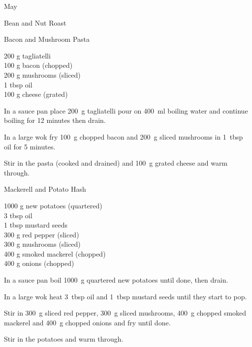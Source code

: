 \begin{menu}{May}
\begin{recipe}{2}{Bean and Nut Roast}
\begin{instructions}
    \end{instructions}
    \end{recipe}%
  
    \begin{recipe}{1}{Bacon and Mushroom Pasta}%
		\begin{ingredients}
		200 g tagliatelli  \\
	100 g bacon (chopped) \\
	200 g mushrooms (sliced) \\
	1 tbsp oil  \\
	100 g cheese (grated) \\
	
		\end{ingredients}
	
    \begin{instructions}
    \item 
      In a
      sauce pan
      place
      200~g  tagliatelli
      pour on
      400~ml  boiling water and continue boiling for 12 minutes then drain.
    \item 
        In a large wok fry 100~g chopped bacon
        and
        200~g sliced mushrooms
        in
        1~tbsp  oil for 5 minutes.
      \item 
        Stir in the pasta (cooked and drained)
        and 100~g grated cheese
        and warm through.
      
    \end{instructions}
    \end{recipe}%
  
    \begin{recipe}{2}{Mackerell and Potato Hash}%
		\begin{ingredients}
		1000 g new potatoes (quartered) \\
	3 tbsp oil  \\
	1 tbsp mustard seeds  \\
	300 g red pepper (sliced) \\
	300 g mushrooms (sliced) \\
	400 g smoked mackerel (chopped) \\
	400 g onions (chopped) \\
	
		\end{ingredients}
	
    \begin{instructions}
    \item 
        In a sauce pan boil
        1000~g quartered new potatoes
        until done,
        then drain.
      \item 
        In a large wok heat
        3~tbsp  oil
        and
        1~tbsp  mustard seeds
        until they start to pop.
      \item 
        Stir in
        300~g sliced red pepper,
        300~g sliced mushrooms,
        400~g chopped smoked mackerel
        and
        400~g chopped onions
        and fry until done.
      \item 
        Stir in the potatoes
        and warm through.
      

\end{instructions}
\end{recipe}
\end{menu}
